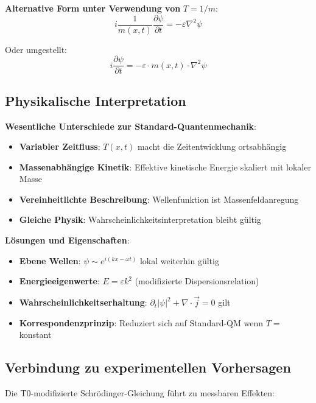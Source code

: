 	\textbf{Alternative Form unter Verwendung von} $T = 1/m$:
	\begin{equation}
		i \frac{1}{m(x,t)} \frac{\partial\psi}{\partial t} = -\varepsilon \nabla^2 \psi
		\label{eq:t0_schrodinger_mass}
	\end{equation}
	
	Oder umgestellt:
	\begin{equation}
		i \frac{\partial\psi}{\partial t} = -\varepsilon \cdot m(x,t) \cdot \nabla^2 \psi
		\label{eq:t0_schrodinger_rearranged}
	\end{equation}
	
	\subsection{Physikalische Interpretation}
	
	\textbf{Wesentliche Unterschiede zur Standard-Quantenmechanik}:
	\begin{itemize}
		\item \textbf{Variabler Zeitfluss}: $T(x,t)$ macht die Zeitentwicklung ortsabhängig
		\item \textbf{Massenabhängige Kinetik}: Effektive kinetische Energie skaliert mit lokaler Masse
		\item \textbf{Vereinheitlichte Beschreibung}: Wellenfunktion ist Massenfeldanregung
		\item \textbf{Gleiche Physik}: Wahrscheinlichkeitsinterpretation bleibt gültig
	\end{itemize}
	
	\textbf{Lösungen und Eigenschaften}:
	\begin{itemize}
		\item \textbf{Ebene Wellen}: $\psi \sim e^{i(kx - \omega t)}$ lokal weiterhin gültig
		\item \textbf{Energieeigenwerte}: $E = \varepsilon k^2$ (modifizierte Dispersionsrelation)
		\item \textbf{Wahrscheinlichkeitserhaltung}: $\partial_t|\psi|^2 + \nabla \cdot \vec{j} = 0$ gilt
		\item \textbf{Korrespondenzprinzip}: Reduziert sich auf Standard-QM wenn $T = $ konstant
	\end{itemize}
	
	\subsection{Verbindung zu experimentellen Vorhersagen}
	
	Die T0-modifizierte Schrödinger-Gleichung führt zu messbaren Effekten:
	
